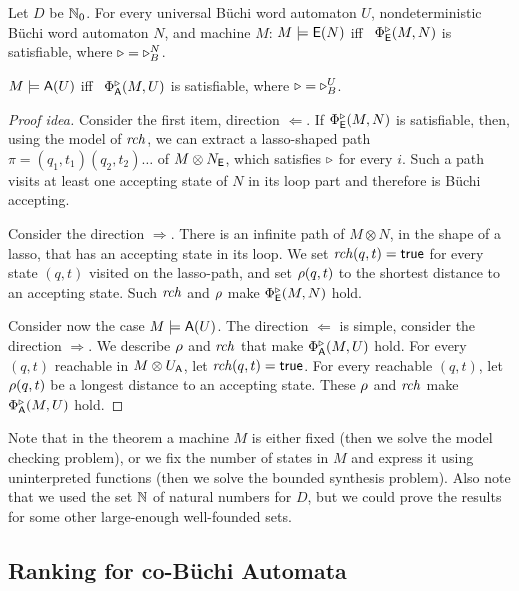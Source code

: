 \begin{theorem}
Let $D$ be $\mathbb{N}_0$.
For every universal B\"uchi word automaton $U$,
nondeterministic B\"uchi word automaton $N$, and
machine $M$:
\li
\- $M \models {\ensuremath{\operatorname{\mathsf{E}}}}(N)$
   iff~
   $\Phi^{\triangleright}_{\operatorname{\mathsf{E}}}(M,N)$ is satisfiable,
   where $\triangleright=\triangleright^N_B$.

\- $M \models {\ensuremath{\operatorname{\mathsf{A}}}}(U)$
   iff~
   $\Phi^{\triangleright}_{\operatorname{\mathsf{A}}}(M,U)$ is satisfiable,
   where $\triangleright=\triangleright^U_B$.
\il
\end{theorem}
\begin{proof}[Proof idea]
Consider the first item, direction $\Leftarrow$.
If $\Phi^{\triangleright}_{\operatorname{\mathsf{E}}}(M,N)$ is satisfiable,
then, using the model of $\mathit{rch}$, we can extract a lasso-shaped path $\pi = (q_1,t_1)(q_2,t_2)\dots$ of $M \otimes N_{\operatorname{\mathsf{E}}}$,
which satisfies $\triangleright$ for every $i$.
Such a path visits at least one accepting state of $N$ in its loop part and therefore is B\"uchi accepting.

Consider the direction $\Rightarrow$.
There is an infinite path of $M \otimes N$, in the shape of a lasso,
that has an accepting state in its loop.
We set $\mathit{rch}(q,t)=\textsf{true}$ for every state $(q,t)$ visited on the lasso-path,
and set $\rho(q,t)$ to the shortest distance to an accepting state.
Such $\mathit{rch}$ and $\rho$ make $\Phi^{\triangleright}_{\operatorname{\mathsf{E}}}(M,N)$ hold.

Consider now the case $M \models {\ensuremath{\operatorname{\mathsf{A}}}}(U)$.
The direction $\Leftarrow$ is simple, consider the direction $\Rightarrow$.
We describe $\rho$ and $\mathit{rch}$ that make $\Phi^{\triangleright}_{\operatorname{\mathsf{A}}}(M,U)$ hold.
For every $(q,t)$ reachable in $M \otimes U_{\operatorname{\mathsf{A}}}$,
let $\mathit{rch}(q,t)=\textsf{true}$.
For every reachable $(q,t)$,
let $\rho(q,t)$ be a longest distance to an accepting state.
These $\rho$ and $\mathit{rch}$ make $\Phi^{\triangleright}_{\operatorname{\mathsf{A}}}(M,U)$ hold.
\end{proof}
Note that in the theorem a machine $M$ is either fixed
(then we solve the model checking problem),
or we fix the number of states in $M$ and express it using uninterpreted functions
(then we solve the bounded synthesis problem).
Also note that we used the set $\mathbb{N}$ of natural numbers for $D$,
but we could prove the results for some other large-enough well-founded sets.


\subsection{Ranking for co-B\"uchi Automata}

